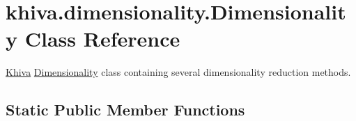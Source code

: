 \hypertarget{classkhiva_1_1dimensionality_1_1_dimensionality}{}\section{khiva.\+dimensionality.\+Dimensionality Class Reference}
\label{classkhiva_1_1dimensionality_1_1_dimensionality}


\mbox{\hyperlink{classkhiva_1_1_khiva}{Khiva}} \mbox{\hyperlink{classkhiva_1_1dimensionality_1_1_dimensionality}{Dimensionality}} class containing several dimensionality reduction methods.  


\subsection*{Static Public Member Functions}
